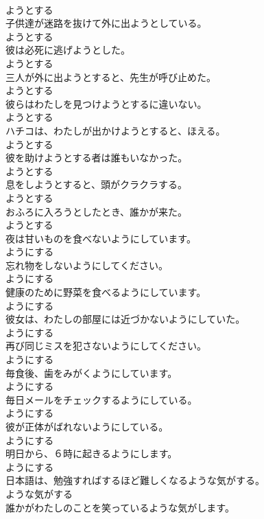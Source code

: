 \documentclass[8pt]{extreport}
\begin{document}
\begin{CJK}{UTF8}{min}
\\	ようとする
\\	子供達が迷路を抜けて外に出ようとしている。	
\\	ようとする
\\	彼は必死に逃げようとした。	
\\	ようとする
\\	三人が外に出ようとすると、先生が呼び止めた。	
\\	ようとする
\\	彼らはわたしを見つけようとするに違いない。	
\\	ようとする
\\	ハチコは、わたしが出かけようとすると、ほえる。	
\\	ようとする
\\	彼を助けようとする者は誰もいなかった。	
\\	ようとする
\\	息をしようとすると、頭がクラクラする。	
\\	ようとする
\\	おふろに入ろうとしたとき、誰かが来た。	
\\	ようとする
\\	夜は甘いものを食べないようにしています。	
\\	ようにする
\\	忘れ物をしないようにしてください。	
\\	ようにする
\\	健康のために野菜を食べるようにしています。	
\\	ようにする
\\	彼女は、わたしの部屋には近づかないようにしていた。	
\\	ようにする
\\	再び同じミスを犯さないようにしてください。	
\\	ようにする
\\	毎食後、歯をみがくようにしています。	
\\	ようにする
\\	毎日メールをチェックするようにしている。	
\\	ようにする
\\	彼が正体がばれないようにしている。	
\\	ようにする
\\	明日から、６時に起きるようにします。	
\\	ようにする
\\	日本語は、勉強すればするほど難しくなるような気がする。	
\\	ような気がする
\\	誰かがわたしのことを笑っているような気がします。	

\end{CJK}
\end{document}
